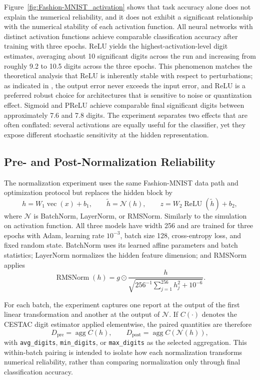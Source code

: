 \documentclass[manuscript, screen]{acmart}
\begin{document}
Figure~\ref{fig:Fashion-MNIST_activation} shows that task accuracy alone does not explain the numerical reliability, and it does not exhibit a significant relationship with the numerical stability of each activation function. All neural networks with distinct activation functions achieve comparable classification accuracy  after training with three epochs. ReLU yields the highest-activation-level digit estimates, averaging about 10 significant digits across the run and increasing from roughly 9.2 to 10.5 digits across the three epochs. This phenomenon matches the theoretical analysis that ReLU is inherently stable with respect to perturbations; as indicated in \citep{reynacruz:hal-05367563}, the output error never exceeds the input error, and ReLU is a preferred robust choice for architectures that is sensitive to noise or quantization effect. Sigmoid and PReLU achieve comparable final significant digits between approximately 7.6 and 7.8 digits. The experiment separates two effects that are often conflated: several activations are equally useful for the classifier, yet they expose different stochastic sensitivity at the hidden representation.


\subsection{Pre- and Post-Normalization Reliability}
\label{sec:exp-normalization}

The normalization experiment uses the same Fashion-MNIST data path and optimization protocol but replaces the hidden block by
\begin{equation}
h=W_1\operatorname{vec}(x)+b_1,
\qquad
\widetilde{h}=\mathcal{N}(h),
\qquad
z=W_2\operatorname{ReLU}(\widetilde{h})+b_2,
\label{eq:normalization-mlp}
\end{equation}
where $\mathcal{N}$ is BatchNorm, LayerNorm, or RMSNorm. Similarly to the simulation on activation function. All three models have width 256 and are trained for three epochs with Adam, learning rate $10^{-3}$, batch size 128, cross-entropy loss, and fixed random state. BatchNorm uses its learned affine parameters and batch statistics; LayerNorm normalizes the hidden feature dimension; and RMSNorm applies
\begin{equation}
\operatorname{RMSNorm}(h)
=
g\odot
\frac{h}{\sqrt{256^{-1}\sum_{j=1}^{256}h_j^2+10^{-6}}}.
\end{equation}

For each batch, the experiment captures one report at the output of the first linear transformation and another at the output of $\mathcal{N}$. If $C(\cdot)$ denotes the CESTAC digit estimator applied elementwise, the paired quantities are therefore
\begin{equation}
D_{\mathrm{pre}}=\operatorname{agg} C(h),
\qquad
D_{\mathrm{post}}=\operatorname{agg} C(\mathcal{N}(h)),
\label{eq:prepost-normalization-digits}
\end{equation}
with \texttt{avg\_digits}, \texttt{min\_digits}, or \texttt{max\_digits} as the selected aggregation. This within-batch pairing is intended to isolate how each normalization transforms numerical reliability, rather than comparing normalization only through final classification accuracy.
\end{document}
